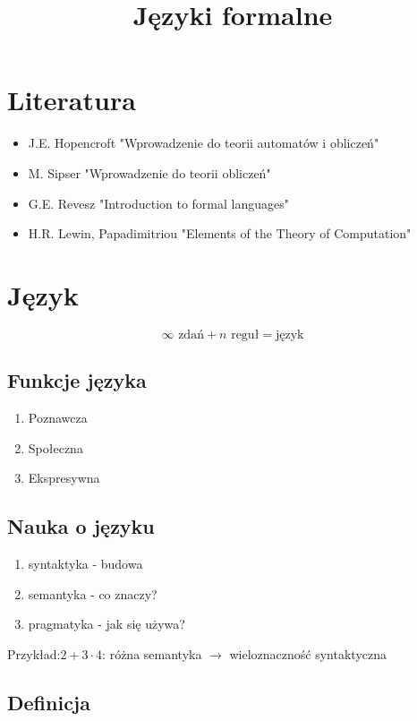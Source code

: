 \documentclass{../notatki}
\title{Języki formalne}
\begin{document}
\tableofcontents

\newpage

\section{Literatura}

\begin{itemize}
  \item J.E. Hopencroft "Wprowadzenie do teorii automatów i obliczeń"
  \item M. Sipser "Wprowadzenie do teorii obliczeń"
  \item G.E. Revesz "Introduction to formal languages"
  \item H.R. Lewin, Papadimitriou "Elements of the Theory of Computation"
\end{itemize}

\section{Język}

$$
\infty \text{ zdań} + n \text{ reguł} = \text{język}
$$

\subsection{Funkcje języka}

\begin{enumerate}
  \item Poznawcza
  \item Społeczna
  \item Ekspresywna
\end{enumerate}

\subsection{Nauka o języku}

\begin{enumerate}
  \item syntaktyka - budowa
  \item semantyka - co znaczy?
  \item pragmatyka - jak się używa?
\end{enumerate}
Przykład:$2 + 3 \cdot 4$: różna semantyka $\rightarrow$
wieloznaczność syntaktyczna

\subsection{Definicja}
\end{document}
